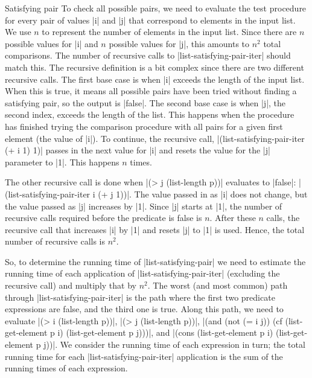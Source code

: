 \begin{schemeregion}
{\begin{example}{Satisfying pair}
To check all possible pairs, we need to evaluate the test procedure for every pair of values \scheme|i| and \scheme|j| that correspond to elements in the input list.  We use $n$ to represent the number of elements in the input list.  Since there are $n$ possible values for \scheme|i| and $n$ possible values for \scheme|j|, this amounts to $n^2$ total comparisons.  The number of recursive calls to \scheme|list-satisfying-pair-iter| should match this.  The recursive definition is a bit complex since there are two different recursive calls.  The first base case is when \scheme|i| exceeds the length of the input list.  When this is true, it means all possible pairs have been tried without finding a satisfying pair, so the output is \schemeresult|false|.  The second base case is when \scheme|j|, the second index, exceeds the length of the list.  This happens when the procedure has finished trying the comparison procedure with all pairs for a given first element (the value of \scheme|i|).  To continue, the recursive call, \scheme|(list-satisfying-pair-iter (+ i 1) 1)| passes in the next value for \scheme|i| and resets the value for the \scheme|j| parameter to \schemeresult|1|.  This happens $n$ times.  

The other recursive call is done when \scheme|(> j (list-length p))| evaluates to \schemeresult|false|: \scheme|(list-satisfying-pair-iter i (+ j 1))|.  The value passed in as \scheme|i| does not change, but the value passed as \scheme|j| increases by \scheme|1|.  Since \scheme|j| starts at \scheme|1|, the number of recursive calls required before the predicate is false is $n$.  After these $n$ calls, the recursive call that increases \scheme|i| by \scheme|1| and resets \scheme|j| to \scheme|1| is used.  Hence, the total number of recursive calls is $n^2$.

So, to determine the running time of \scheme|list-satisfying-pair| we need to estimate the running time of each application of \scheme|list-satisfying-pair-iter| (excluding the recursive call) and multiply that by $n^2$.  The worst (and most common) path through \scheme|list-satisfying-pair-iter| is the path where the first two predicate expressions are false, and the third one is true.  Along this path, we need to evaluate \scheme|(> i (list-length p))|, \scheme|(> j (list-length p))|, \scheme|(and (not (= i j)) (cf (list-get-element p i) (list-get-element p j)))|, and \scheme|(cons (list-get-element p i) (list-get-element p j))|.  We consider the running time of each expression in turn; the total running time for each \scheme|list-satisfying-pair-iter| application is the sum of the running times of each expression.


\end{example}}
\end{schemeregion}

